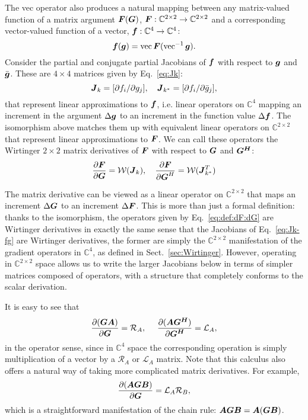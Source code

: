 \documentclass[useAMS,usenatbib]{mn2e}
\newcommand{\COMPLEX}{\mathbb{C}}
\newcommand{\mat}[1]{{\bmath{#1}}}
\newcommand{\JJ}{\mat{J}} %
\newcommand{\Rop}[1]{\mathcal{R}_{{#1}}}
\newcommand{\Lop}[1]{\mathcal{L}_{{#1}}}
\numberwithin{equation}{section}
\begin{document}
The vec operator also produces a natural mapping between any matrix-valued function of a 
matrix argument $\mat{F}(\mat{G})$, $\mat{F}:\COMPLEX^{2\times2}\to\COMPLEX^{2\times2}$ and a corresponding 
vector-valued function of a vector, $\bmath{f}:\COMPLEX^4\to\COMPLEX^4$:
\begin{equation}
\bmath{f}(\bmath{g}) = \VEC{\mat{F}(\VECINV{\bmath{g}})}.
\end{equation}
Consider the partial and conjugate partial Jacobians of $\bmath{f}$ with respect to $\bmath{g}$ 
and $\bar{\bmath{g}}$. These are $4\times4$ matrices given by Eq.~\ref{eq:Jk}:
\begin{equation}
\label{eq:Jk-fg}
\JJ_k = [ \partial f_i / \partial g_j ],~~~\JJ_{k^*} = [ \partial f_i / \partial \bar{g}_j ],
\end{equation}
that represent linear approximations to $\bmath{f}$, i.e. linear operators on $\COMPLEX^4$ 
mapping an increment in the argument $\Delta\bmath{g}$ to an increment in the function value $\Delta\bmath{f}$. 
The isomorphism above matches them up with equivalent linear operators on $\COMPLEX^{2\times2}$ that represent
linear approximations to $\bmath{F}$. We can call these operators the Wirtinger $2\times2$ matrix derivatives 
of $\mat{F}$ with respect to $\mat{G}$ and $\mat{G^H}$:
\begin{equation}
\label{eq:def:dF:dG}
\frac{\partial\mat{F}}{\partial{\mat{G}}} = \mathcal{W}(\JJ_k),~~~
\frac{\partial\mat{F}}{\partial{\mat{G}^H}} = \mathcal{W}(\JJ_{k^*}^T)
\end{equation}

The matrix derivative can be viewed as a linear operator on $\COMPLEX^{2\times2}$ that maps an increment
$\Delta\mat{G}$ 
to an increment $\Delta\mat{F}$. This is more than just a formal definition: thanks to the isomorphism, the operators 
given by Eq.~\ref{eq:def:dF:dG}  are Wirtinger derivatives in exactly the same sense that the Jacobians of 
Eq.~\ref{eq:Jk-fg} are Wirtinger derivatives, the former are simply the $\COMPLEX^{2\times2}$ manifestation of
the gradient operators in $\COMPLEX^4$, as defined in Sect.~\ref{sec:Wirtinger}. However, operating in 
$\COMPLEX^{2\times2}$ space allows us to write the larger Jacobians below in terms of simpler matrices composed 
of operators, with a structure that completely conforms to the scalar derivation.

It is easy to see that
\begin{equation}
\frac{\partial(\mat{GA})}{\partial{\mat{G}}} = \Rop{A},~~~~\frac{\partial(\mat{AG^H})}{\partial{\mat{G^H}}} = \Lop{A},
\end{equation}
in the operator sense, since in $\COMPLEX^4$ space the corresponding operation is simply multiplication of 
a vector by a $\Rop{A}$ or $\Lop{A}$ matrix. Note that this calculus also offers a natural way of taking more
complicated matrix derivatives. For example,
\begin{equation}
\frac{\partial(\mat{AGB})}{\partial{\mat{G}}} = \Lop{A}\Rop{B},
\end{equation}
which is a straightforward manifestation of the chain rule: $\mat{AGB}=\mat{A}(\mat{GB})$.
\end{document}
